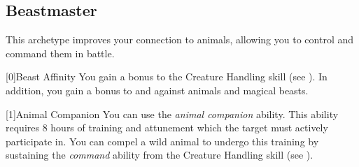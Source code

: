    \newpage
    \subsection{Beastmaster}
        This archetype improves your connection to animals, allowing you to control and command them in battle.

        [0]{Beast Affinity} You gain a  bonus to the Creature Handling skill (see ).
        In addition, you gain a  bonus to  and  against animals and magical beasts.

        [1]{Animal Companion}
        You can use the \textit{animal companion} ability.
        This ability requires 8 hours of training and attunement which the target must actively participate in.
        You can compel a wild animal to undergo this training by sustaining the \textit{command} ability from the Creature Handling skill (see ).
